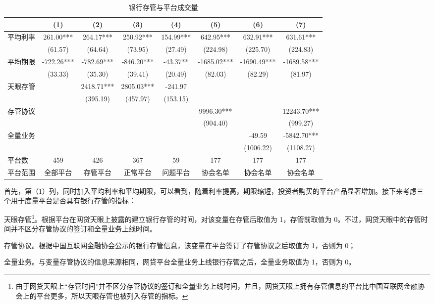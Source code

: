 \documentclass[lang=cn,11pt]{elegantpaper}
\begin{document}
\begin{table}[htbp]
  \centering
  \caption{银行存管与平台成交量}
    \begin{tabular}{lccccccc}
    \toprule
     & (1)   & (2)   & (3)   & (4)   & (5)   & (6)   & (7) \\
    \midrule
    平均利率  & 261.00*** & 264.17*** & 250.92*** & 154.99*** & 642.95*** & 632.91*** & 631.61*** \\
          & (61.57) & (64.64) & (73.95) & (27.49) & (224.98) & (225.70) & (224.83) \\
    平均期限  & -722.26*** & -782.69*** & -846.20*** & -43.37** & -1685.02*** & -1690.49*** & -1689.58*** \\
          & (33.33) & (35.30) & (39.41) & (20.49) & (82.03) & (82.29) & (81.97) \\
    天眼存管  &       & 2418.71*** & 2805.03*** & -241.97 &       &       &  \\
          &       & (395.19) & (457.97) & (153.15) &       &       &  \\
    存管协议  &       &       &       &       & 9996.30*** &       & 12243.70*** \\
          &       &       &       &       & (904.40) &       & (999.27) \\
    全量业务  &       &       &       &       &       & -49.59 & -5842.70*** \\
          &       &       &       &       &       & (1006.22) & (1108.27) \\
    平台数   & 459   & 426   & 367   & 59    & 177   & 177   & 177 \\
    平台范围  & 全部平台    & 存管平台    & 正常平台  & 问题平台  & 协会名单    & 协会名单    & 协会名单 \\
    \bottomrule
    \end{tabular}%
  \label{tab:volreg}%
\end{table}%

首先，第（1）列，同时加入平均利率和平均期限，可以看到，随着利率提高，期限缩短，投资者购买的平台产品显著增加。接下来考虑三个用于度量平台是否具有银行存管的指标：
\begin{enumerate*}[label=（\arabic*）]
    \item 天眼存管\footnote{由于网贷天眼上“存管时间”并不区分存管协议的签订和全量业务上线时间，并且，网贷天眼上拥有存管信息的平台比中国互联网金融协会上的平台更多，所以天眼存管也被列入存管的指标。}。根据平台在网贷天眼上披露的建立银行存管的时间，对该变量在存管后取值为 1，存管前取值为 0。不过，网贷天眼中的存管时间并不区分存管协议的签订和全量业务上线时间。
    \item 存管协议。根据中国互联网金融协会公示的银行存管信息，该变量在平台签订了存管协议之后取值为 1，否则为 0；
    \item 全量业务。与变量存管协议的信息来源相同，网贷平台全量业务上线银行存管之后，全量业务取值为 1，否则为 0。
\end{enumerate*}
\end{document}
